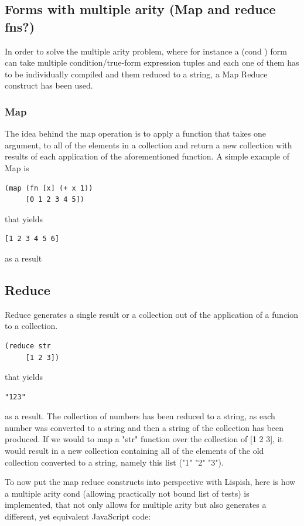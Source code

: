 \subsection{Forms with multiple arity (Map and reduce fns?)}

In order to solve the multiple arity problem, where for instance a (cond ) form can take multiple condition/true-form expression tuples and each one of them has to be individually compiled and them reduced to a string, a Map Reduce construct has been used. 

\subsubsection{Map}
The idea behind the map operation is to apply a function that takes one argument, to all of the elements in a collection and return a new collection with results of each application of the aforementioned function. 
A simple example of Map is 

\begin{verbatim}
(map (fn [x] (+ x 1)) 
	 [0 1 2 3 4 5])
\end{verbatim}
that yields 
\begin{verbatim}
[1 2 3 4 5 6]
\end{verbatim}
as a result

\subsection{Reduce}
Reduce generates a single result or a collection out of the application of a funcion to a collection.	

\begin{verbatim}
(reduce str 
	 [1 2 3])
\end{verbatim}
that yields 
\begin{verbatim}
"123"
\end{verbatim}
as a result. The collection of numbers has been reduced to a string, as each number was converted to a string and then a string of the collection has been produced.
If we would to map a "str" function over the collection of [1 2 3], it would result in a new collection containing all of the elements of the old collection converted to a string, namely this list ("1" "2" "3").

To now put the map reduce constructs into perspective with Lispish, here is how a multiple arity cond (allowing practically not bound list of tests) is implemented, that not only allows for multiple arity but also generates a different, yet equivalent JavaScript code: 

